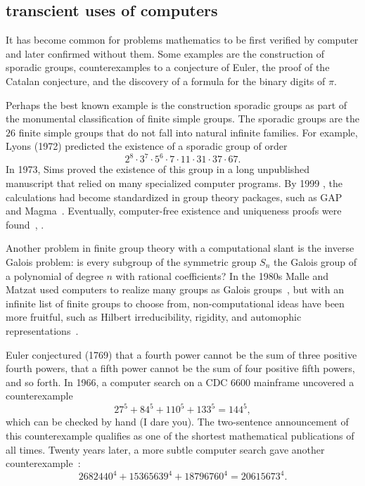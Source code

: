 \documentclass{llncs}
\begin{document}



\subsection{transcient uses of computers}

It has become common for problems mathematics to be first verified by
computer and later confirmed without them.  Some examples are
the construction of sporadic groups, counterexamples to a conjecture
of Euler, the proof of the Catalan conjecture, and the discovery of a formula
for the binary digits of $\pi$.

Perhaps the best known example is the construction sporadic groups as
part of the monumental classification of finite simple groups.  The
sporadic groups are the $26$ finite simple groups that do not fall into
natural infinite families.  For example,  Lyons (1972) predicted
the existence of a sporadic group of order
\[
2^ 8\cdot 3^7\cdot 5^6\cdot  7\cdot 11 \cdot 31 \cdot 37 \cdot 67.
\]
In 1973, Sims proved the existence of this group in a long unpublished
manuscript that relied on many specialized computer programs.  By 1999
, the calculations had become standardized in group theory packages,
such as GAP and Magma~\cite{HS99}.  Eventually, computer-free
existence and uniqueness proofs were found~\cite{MParker},
\cite{AS92}.


Another problem in finite group theory with a computational slant is
the inverse Galois problem: is every subgroup of the symmetric group
$S_n$ the Galois group of a polynomial of degree $n$ with rational
coefficients?  In the 1980s Malle and Matzat used computers to realize
many groups as Galois groups~\cite{MM}, but with an infinite list of
finite groups to choose from, non-computational ideas have been more
fruitful, such as Hilbert irreducibility, rigidity, and automophic
representations~\cite{KLS}.

\smallskip

Euler conjectured (1769) that a fourth power cannot be the sum of
three positive fourth powers, that a fifth power cannot be the sum of
four positive fifth powers, and so forth.  In 1966, a computer search
\cite{LP66} on a CDC 6600 mainframe uncovered a counterexample
\[
27^5 + 84^5 + 110^5 + 133^5 = 144^5,
\]
which can be checked by hand (I dare you).  The two-sentence
announcement of this counterexample qualifies as one of the shortest
mathematical publications of all times.  Twenty years later, a more
subtle computer search gave another counterexample~\cite{Elkies88}:
\[
2682440^4 + 15365639^4 + 18796760^4 = 20615673^4.
\]
\end{document}
